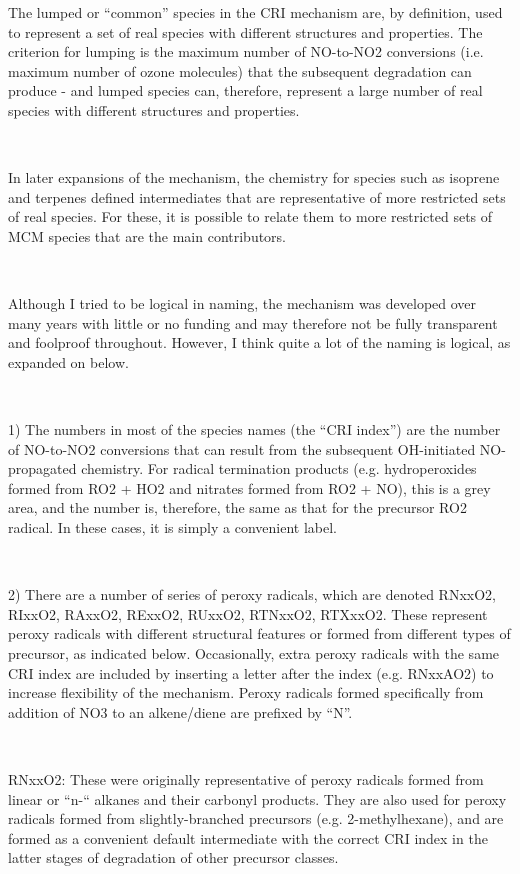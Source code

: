 {\selectfont \parbox{\textwidth}{
The lumped or “common” species in the CRI mechanism are, by definition, used to represent a set of real species with different structures and properties. The criterion for lumping is the maximum number of NO-to-NO2 conversions (i.e. maximum number of ozone molecules) that the subsequent degradation can produce - and lumped species can, therefore, represent a large number of real species with different structures and properties.
\\}\\ \parbox{\textwidth}{
In later expansions of the mechanism, the chemistry for species such as isoprene and terpenes defined intermediates that are representative of more restricted sets of real species. For these, it is possible to relate them to more restricted sets of MCM species that are the main contributors.
\\}\\ \parbox{\textwidth}{
Although I tried to be logical in naming, the mechanism was developed over many years with little or no funding and may therefore not be fully transparent and foolproof throughout. However, I think quite a lot of the naming is logical, as expanded on below.
\\}\\ \parbox{\textwidth}{
1) The numbers in most of the species names (the “CRI index”) are the number of NO-to-NO2 conversions that can result from the subsequent OH-initiated NO-propagated chemistry. For radical termination products (e.g. hydroperoxides formed from RO2 + HO2 and nitrates formed from RO2 + NO), this is a grey area, and the number is, therefore, the same as that for the precursor RO2 radical. In these cases, it is simply a convenient label.
\\}\\ \parbox{\textwidth}{
2) There are a number of series of peroxy radicals, which are denoted RNxxO2, RIxxO2, RAxxO2, RExxO2, RUxxO2, RTNxxO2, RTXxxO2. These represent peroxy radicals with different structural features or formed from different types of precursor, as indicated below. Occasionally, extra peroxy radicals with the same CRI index are included by inserting a letter after the index (e.g. RNxxAO2) to increase flexibility of the mechanism. Peroxy radicals formed specifically from addition of NO3 to an alkene/diene are prefixed by “N”.
\\}\\ \parbox{\textwidth}{
RNxxO2: These were originally representative of peroxy radicals formed from linear or “n-“ alkanes and their carbonyl products. They are also used for peroxy radicals formed from slightly-branched precursors (e.g. 2-methylhexane), and are formed as a convenient default intermediate with the correct CRI index in the latter stages of degradation of other precursor classes.
}}
